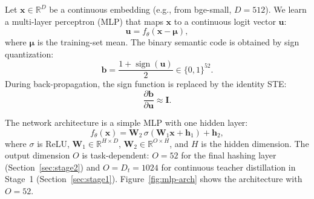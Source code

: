 \documentclass[11pt,a4paper]{article}
\DeclareMathOperator{\sign}{sign}
\begin{document}
Let $\mathbf{x} \in \mathbb{R}^D$ be a continuous embedding (e.g., from bge-small, $D=512$). We learn a multi-layer perceptron (MLP) that maps $\mathbf{x}$ to a continuous logit vector $\mathbf{u}$:
\begin{equation}
    \mathbf{u} = f_\theta(\mathbf{x} - \boldsymbol{\mu}),
\end{equation}
where $\boldsymbol{\mu}$ is the training-set mean. The binary semantic code is obtained by sign quantization:
\begin{equation}
    \mathbf{b} = \frac{1 + \sign(\mathbf{u})}{2} \in \{0, 1\}^{52}.
\end{equation}
During back-propagation, the sign function is replaced by the identity STE:
\begin{equation}
    \frac{\partial \mathbf{b}}{\partial \mathbf{u}} \approx \mathbf{I}.
\end{equation}

The network architecture is a simple MLP with one hidden layer:
\begin{equation}
    f_\theta(\mathbf{x}) = \mathbf{W}_2 \, \sigma(\mathbf{W}_1 \mathbf{x} + \mathbf{h}_1) + \mathbf{h}_2,
\end{equation}
where $\sigma$ is ReLU, $\mathbf{W}_1 \in \mathbb{R}^{H \times D}$, $\mathbf{W}_2 \in \mathbb{R}^{O \times H}$, and $H$ is the hidden dimension. The output dimension $O$ is task-dependent: $O=52$ for the final hashing layer (Section~\ref{sec:stage2}) and $O=D_t=1024$ for continuous teacher distillation in Stage~1 (Section~\ref{sec:stage1}). Figure~\ref{fig:mlp-arch} shows the architecture with $O=52$.
\end{document}
